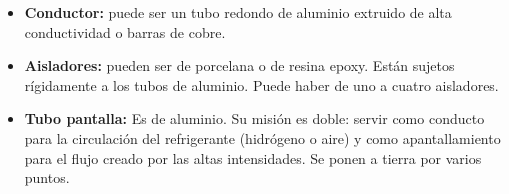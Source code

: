 			\begin{itemize}
				\item \textbf{Conductor:} puede ser un tubo redondo de aluminio extruido de alta conductividad o barras de cobre.
				\item \textbf{Aisladores:} pueden ser de porcelana o de resina epoxy. Están sujetos rígidamente a los tubos de aluminio. Puede haber de uno a cuatro aisladores.
				\item \textbf{Tubo pantalla:} Es de aluminio. Su misión es doble: servir como conducto para la circulación del refrigerante (hidrógeno o aire) y como apantallamiento para el flujo creado por las altas intensidades. Se ponen a tierra por varios puntos.
			\end{itemize}
		